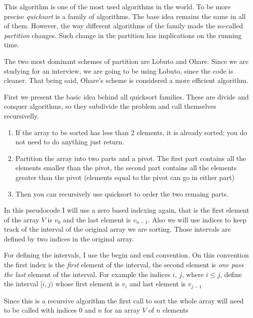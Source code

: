 This algorithm is one of the most used algorithms in the world.
To be more precise \emph{quicksort} is a family of algorithms.
The base idea remains the same in all of them.
However, the way different algorithms of the family made the so-called \emph{partition} changes.
Such change in the partition has implications on the running time.

The two most dominant schemes of partition are Lobuto and Ohare.
Since we are studying for an interview, we are going to be using Lobuto, since the code is cleaner.
That being said, Ohare's scheme is considered a more efficient algorithm.

First we present the basic idea behind all quicksort families. 
These are divide and conquer algorithms, so they subdivide the problem and call themselves recursivelly.

\begin{enumerate}
 \item If the array to be sorted has less than 2 elements, it is already sorted; you do not need to do anything just return.
 \item Partition the array into two parts and a pivot. The first part contains all the elements smaller than the pivot, the second part contains all the elements greater than the pivot (elements equal to the pivot can go in either part)
 \item Then you can recursively use quicksort to order the two remaing parts.
\end{enumerate}

In this pseudocode I will use a zero based indexing again, that is the first element of the array $V$ is $v_0$ and the last element is $v_{n-1}$.
Also we will use indices to keep track of the interval of the original array we are sorting.
Those intervals are defined by two indices in the original array.

For defining the intervals, I use the begin and end convention.
On this convention the first index is the \emph{first} element of the interval, the second element is \emph{one pass the last} element of the interval.
For example the indices $i$, $j$, where $i \leq j$, define the interval $[i, j)$ whose first element is $v_i$ and last element is $v_{j-1}$

Since this is a recursive algorithm the first call to sort the whole array will need to be called with indices $0$ and $n$ for an array $V$ of $n$ elements

